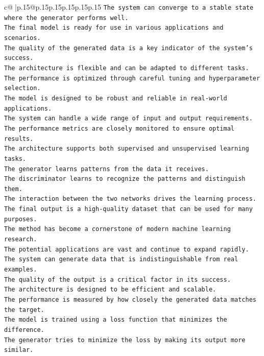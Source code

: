 \documentclass{article}
\begin{document}
{\begin{supertabular}{c@{$\;$}|p{.15\linewidth}@{}p{.15\linewidth}p{.15\linewidth}p{.15\linewidth}p{.15\linewidth}p{.15\linewidth}}
{{{\texttt{The system can converge to a stable state where the generator performs well.  } \\
\texttt{The final model is ready for use in various applications and scenarios.  } \\
\texttt{The quality of the generated data is a key indicator of the system's success.  } \\
\texttt{The architecture is flexible and can be adapted to different tasks.  } \\
\texttt{The performance is optimized through careful tuning and hyperparameter selection.  } \\
\texttt{The model is designed to be robust and reliable in real{-}world applications.  } \\
\texttt{The system can handle a wide range of input and output requirements.  } \\
\texttt{The performance metrics are closely monitored to ensure optimal results.  } \\
\texttt{The architecture supports both supervised and unsupervised learning tasks.  } \\
\texttt{The generator learns patterns from the data it receives.  } \\
\texttt{The discriminator learns to recognize the patterns and distinguish them.  } \\
\texttt{The interaction between the two networks drives the learning process.  } \\
\texttt{The final output is a high{-}quality dataset that can be used for many purposes.  } \\
\texttt{The method has become a cornerstone of modern machine learning research.  } \\
\texttt{The potential applications are vast and continue to expand rapidly.  } \\
\texttt{The system can generate data that is indistinguishable from real examples.  } \\
\texttt{The quality of the output is a critical factor in its success.  } \\
\texttt{The architecture is designed to be efficient and scalable.  } \\
\texttt{The performance is measured by how closely the generated data matches the target.  } \\
\texttt{The model is trained using a loss function that minimizes the difference.  } \\
\texttt{The generator tries to minimize the loss by making its output more similar.  } \\
}}}
\end{supertabular}}
\end{document}
